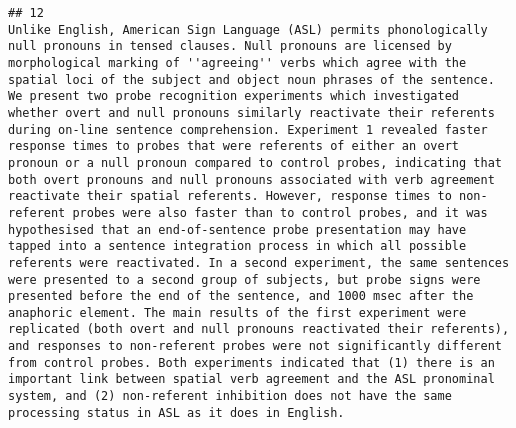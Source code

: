 \documentclass[
  english,
  man]{apa6}
\begin{document}
\begin{verbatim}
## 12                                                                                                                                                                                                                                                                                                                                                                                                                                                                                                                                                                                                                                                                                                                                                                                                                                                                                                                                                                                                                  Unlike English, American Sign Language (ASL) permits phonologically null pronouns in tensed clauses. Null pronouns are licensed by morphological marking of ''agreeing'' verbs which agree with the spatial loci of the subject and object noun phrases of the sentence. We present two probe recognition experiments which investigated whether overt and null pronouns similarly reactivate their referents during on-line sentence comprehension. Experiment 1 revealed faster response times to probes that were referents of either an overt pronoun or a null pronoun compared to control probes, indicating that both overt pronouns and null pronouns associated with verb agreement reactivate their spatial referents. However, response times to non-referent probes were also faster than to control probes, and it was hypothesised that an end-of-sentence probe presentation may have tapped into a sentence integration process in which all possible referents were reactivated. In a second experiment, the same sentences were presented to a second group of subjects, but probe signs were presented before the end of the sentence, and 1000 msec after the anaphoric element. The main results of the first experiment were replicated (both overt and null pronouns reactivated their referents), and responses to non-referent probes were not significantly different from control probes. Both experiments indicated that (1) there is an important link between spatial verb agreement and the ASL pronominal system, and (2) non-referent inhibition does not have the same processing status in ASL as it does in English.

\end{verbatim}
\end{document}
